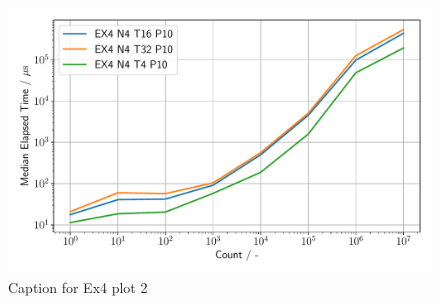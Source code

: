 \begin{figure}[h]
    \begin{center}
        \includegraphics[width=1.0\linewidth]{figures/Ex4_2.pdf}
        \caption{Caption for Ex4 plot 2}
        \label{Ex4_2_p}
    \end{center}
\end{figure}

